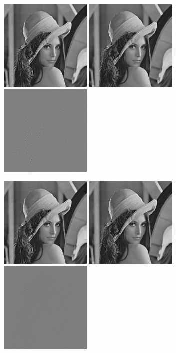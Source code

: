 \documentclass{article}
\begin{document}
\includegraphics[width=0.33\textwidth]{../data/lenna.jpg}
\includegraphics[width=0.33\textwidth]{../data/zonal_3_lenna.jpg}
\includegraphics[width=0.33\textwidth]{../data/delta_zonal_3_lenna.jpg}

\includegraphics[width=0.33\textwidth]{../data/lenna.jpg}
\includegraphics[width=0.33\textwidth]{../data/zonal_5_lenna.jpg}
\includegraphics[width=0.33\textwidth]{../data/delta_zonal_5_lenna.jpg}
\end{document}
